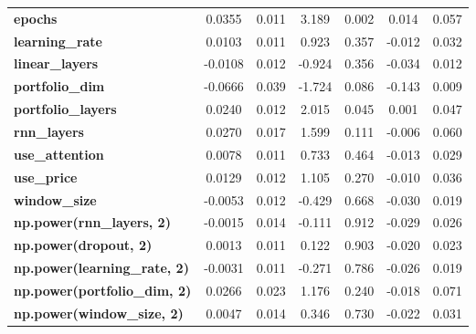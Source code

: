 \begin{center}
\begin{tabular}{lcccccc}
\textbf{epochs}                            &       0.0355  &        0.011     &     3.189  &         0.002        &        0.014    &        0.057     \\
\textbf{learning\_rate}                    &       0.0103  &        0.011     &     0.923  &         0.357        &       -0.012    &        0.032     \\
\textbf{linear\_layers}                    &      -0.0108  &        0.012     &    -0.924  &         0.356        &       -0.034    &        0.012     \\
\textbf{portfolio\_dim}                    &      -0.0666  &        0.039     &    -1.724  &         0.086        &       -0.143    &        0.009     \\
\textbf{portfolio\_layers}                 &       0.0240  &        0.012     &     2.015  &         0.045        &        0.001    &        0.047     \\
\textbf{rnn\_layers}                       &       0.0270  &        0.017     &     1.599  &         0.111        &       -0.006    &        0.060     \\
\textbf{use\_attention}                    &       0.0078  &        0.011     &     0.733  &         0.464        &       -0.013    &        0.029     \\
\textbf{use\_price}                        &       0.0129  &        0.012     &     1.105  &         0.270        &       -0.010    &        0.036     \\
\textbf{window\_size}                      &      -0.0053  &        0.012     &    -0.429  &         0.668        &       -0.030    &        0.019     \\
\textbf{np.power(rnn\_layers, 2)}          &      -0.0015  &        0.014     &    -0.111  &         0.912        &       -0.029    &        0.026     \\
\textbf{np.power(dropout, 2)}              &       0.0013  &        0.011     &     0.122  &         0.903        &       -0.020    &        0.023     \\
\textbf{np.power(learning\_rate, 2)}       &      -0.0031  &        0.011     &    -0.271  &         0.786        &       -0.026    &        0.019     \\
\textbf{np.power(portfolio\_dim, 2)}       &       0.0266  &        0.023     &     1.176  &         0.240        &       -0.018    &        0.071     \\
\textbf{np.power(window\_size, 2)}         &       0.0047  &        0.014     &     0.346  &         0.730        &       -0.022    &        0.031     \\

\end{tabular}
\end{center}
